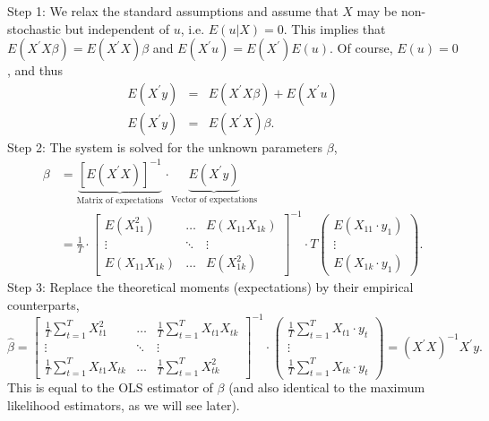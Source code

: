 \documentclass{article}
\begin{document}
\begin{solution}
Step 1: We relax the standard assumptions and assume that $X$ may be
non-stochastic but independent of $u$, i.e. $E(u|X)=0$. This implies that
$E\left( X^{\prime }X\beta \right) =E\left( X^{\prime }X\right) \beta $ and
$E\left( X^{\prime
}u\right) =E\left( X^{\prime }\right) E(u)$. Of course, $E(u)=0$, and thus%
\begin{eqnarray*}
E\left( X^{\prime }y\right)  &=&E\left( X^{\prime }X\beta \right) +E\left(
X^{\prime }u\right)  \\
E\left( X^{\prime }y\right)  &=&E\left( X^{\prime }X\right) \beta .
\end{eqnarray*}%
Step 2: The system is solved for the unknown parameters $\beta $,%
\begin{align*}
\beta &= \underbrace{\left[E\left( X^{\prime }X\right)\right]^{-1}}_{\text{Matrix of expectations}} \cdot \underbrace{E\left( X^{\prime}y\right)}_\text{Vector of expectations}\\
&= \frac{1}{T}\cdot \begin{bmatrix}
                    E(X_{11}^2) & \dots & E(X_{11}X_{1k})\\
                    \vdots & \ddots &\vdots\\
                    E(X_{11}X_{1k}) & \dots & E(X_{1k}^2)
                  \end{bmatrix}^{-1}
\cdot T
\begin{pmatrix}
    E(X_{11}\cdot y_1)\\
    \vdots\\
    E(X_{1k}\cdot y_1)
\end{pmatrix}.
\end{align*}%
Step 3: Replace the theoretical moments (expectations) by their empirical
counterparts,%
\begin{equation*}
\hat{\beta}=
\begin{bmatrix}
    \frac{1}{T}\sum_{t=1}^T X_{t1}^2 & \dots & \frac{1}{T}\sum_{t=1}^T X_{t1}X_{tk}\\
    \vdots & \ddots &\vdots\\
    \frac{1}{T}\sum_{t=1}^T X_{t1}X_{tk} & \dots & \frac{1}{T}\sum_{t=1}^T X_{tk}^2
\end{bmatrix}^{-1}
\cdot
\begin{pmatrix}
    \frac{1}{T}\sum_{t=1}^T X_{t1}\cdot y_t\\
    \vdots\\
    \frac{1}{T}\sum_{t=1}^T X_{tk}\cdot y_t
\end{pmatrix}=(X^{\prime }X)^{-1}X^{\prime }y.
\end{equation*}%
This is equal to the OLS estimator of $\beta $ (and also identical to the
maximum likelihood estimators, as we will see later).
\end{solution}
\end{document}

